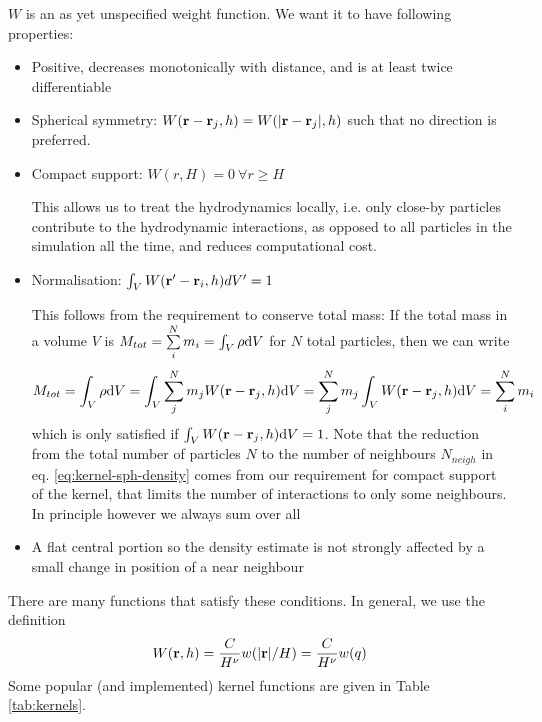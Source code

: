 $W$ is an as yet unspecified weight function.
We want it to have following properties:
\begin{itemize}
	
	\item Positive, decreases monotonically with distance, and is at least twice differentiable

	\item Spherical symmetry: $W(\mathbf{r} - \mathbf{r}_j, h) = W(|\mathbf{r} - \mathbf{r}_j|, h)$ such that no direction is preferred.
	
	\item Compact support: $W(r, H) = 0 \ \forall r \geq H$
	
	This allows us to treat the hydrodynamics locally, i.e. only close-by particles contribute to the hydrodynamic interactions, as opposed to all particles in the simulation all the time, and reduces computational cost.
	
	\item Normalisation: $\int_V W(\mathbf{r}' - \mathbf{r}_i, h) dV' = 1$
			
			This follows from the requirement to conserve total mass: If the total mass in a volume $V$ is 
			$M_{tot} = \sum_i^N m_i = \int_V \rho \de V$ for $N$ total particles, then we can write
			\begin{align}
				M_{tot} = \int_V \rho \de V
						= \int_V \sum_{j}^{N} m_j W(\R - \R_j, h) \de V
						= \sum_{j}^{N} m_j \int_V W(\R - \R_j, h) \de V
						= \sum_i^N m_i 
			\end{align}
			which is only satisfied if $\int_V W(\mathbf{r} - \mathbf{r}_j, h) \mathrm{d} V = 1$.
			Note that the reduction from the total number of particles $N$ to the number of neighbours $N_{neigh}$ in eq. \ref{eq:kernel-sph-density} comes from our requirement for compact support of the kernel, that limits the number of interactions to only some neighbours.
			In principle however we always sum over all 
			
	\item A flat central portion so the density estimate is not strongly affected by a small change in position of a near neighbour

\end{itemize}



There are many functions that satisfy these conditions.
In general, we use the definition
\begin{equation}
	W(\mathbf{r}, h) = \frac{C}{H^{\nu}} w (|\mathbf{r}|/H) = \frac{C}{H^{\nu}} w (q) 
\end{equation}
Some popular (and implemented) kernel functions are given in Table \ref{tab:kernels}.

